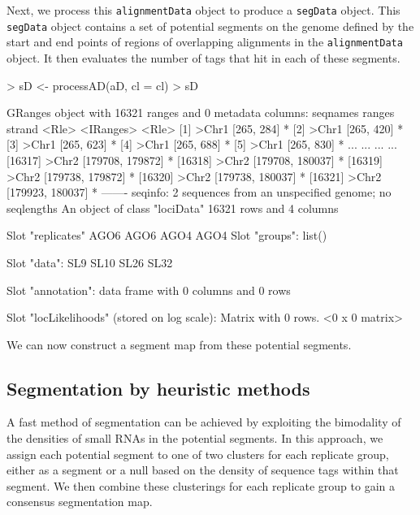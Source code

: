 \documentclass[a4paper]{article}
\begin{document}
Next, we process this \verb'alignmentData' object to produce a \verb'segData' object. This \verb'segData' object contains a set of potential segments on the genome defined by the start and end points of regions of overlapping alignments in the \verb'alignmentData' object. It then evaluates the number of tags that hit in each of these segments.

\begin{Schunk}
\begin{Sinput}
> sD <- processAD(aD, cl = cl)
> sD
\end{Sinput}
\begin{Soutput}
GRanges object with 16321 ranges and 0 metadata columns:
          seqnames           ranges strand
             <Rle>        <IRanges>  <Rle>
      [1]    >Chr1       [265, 284]      *
      [2]    >Chr1       [265, 420]      *
      [3]    >Chr1       [265, 623]      *
      [4]    >Chr1       [265, 688]      *
      [5]    >Chr1       [265, 830]      *
      ...      ...              ...    ...
  [16317]    >Chr2 [179708, 179872]      *
  [16318]    >Chr2 [179708, 180037]      *
  [16319]    >Chr2 [179738, 179872]      *
  [16320]    >Chr2 [179738, 180037]      *
  [16321]    >Chr2 [179923, 180037]      *
  -------
  seqinfo: 2 sequences from an unspecified genome; no seqlengths
An object of class "lociData"
16321 rows and 4 columns

Slot "replicates"
AGO6 AGO6 AGO4 AGO4
Slot "groups":
list()

Slot "data":
     SL9 SL10 SL26 SL32

Slot "annotation":
data frame with 0 columns and 0 rows

Slot "locLikelihoods" (stored on log scale):
Matrix with  0  rows.
<0 x 0 matrix>
\end{Soutput}
\end{Schunk}



We can now construct a segment map from these potential segments.

\subsection*{Segmentation by heuristic methods}

A fast method of segmentation can be achieved by exploiting the bimodality of the densities of small RNAs in the potential segments. In this approach, we assign each potential segment to one of two clusters for each replicate group, either as a segment or a null based on the density of sequence tags within that segment. We then combine these clusterings for each replicate group to gain a consensus segmentation map.
\end{document}
